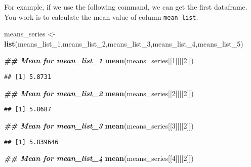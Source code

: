\documentclass[
]{article}
\newenvironment{Shaded}{\begin{snugshade}}{\end{snugshade}}
\newcommand{\DecValTok}[1]{\textcolor[rgb]{0.00,0.00,0.81}{#1}}
\newcommand{\DocumentationTok}[1]{\textcolor[rgb]{0.56,0.35,0.01}{\textbf{\textit{#1}}}}
\newcommand{\FunctionTok}[1]{\textcolor[rgb]{0.13,0.29,0.53}{\textbf{#1}}}
\newcommand{\NormalTok}[1]{#1}
\newcommand{\OtherTok}[1]{\textcolor[rgb]{0.56,0.35,0.01}{#1}}
\begin{document}
For example, if we use the following command, we can get the first
dataframe. You work is to calculate the mean value of column
\texttt{mean\_list}.

\begin{Shaded}
\begin{Highlighting}[]
\NormalTok{means\_series }\OtherTok{\textless{}{-}} \FunctionTok{list}\NormalTok{(means\_list\_1,means\_list\_2,means\_list\_3,means\_list\_4,means\_list\_5)}
\end{Highlighting}
\end{Shaded}

\begin{Shaded}
\begin{Highlighting}[]
\DocumentationTok{\#\# Mean for mean\_list\_1}
\FunctionTok{mean}\NormalTok{(means\_series[[}\DecValTok{1}\NormalTok{]][[}\DecValTok{2}\NormalTok{]])}
\end{Highlighting}
\end{Shaded}

\begin{verbatim}
## [1] 5.8731
\end{verbatim}

\begin{Shaded}
\begin{Highlighting}[]
\DocumentationTok{\#\# Mean for mean\_list\_2}
\FunctionTok{mean}\NormalTok{(means\_series[[}\DecValTok{2}\NormalTok{]][[}\DecValTok{2}\NormalTok{]])}
\end{Highlighting}
\end{Shaded}

\begin{verbatim}
## [1] 5.8687
\end{verbatim}

\begin{Shaded}
\begin{Highlighting}[]
\DocumentationTok{\#\# Mean for mean\_list\_3}
\FunctionTok{mean}\NormalTok{(means\_series[[}\DecValTok{3}\NormalTok{]][[}\DecValTok{2}\NormalTok{]])}
\end{Highlighting}
\end{Shaded}

\begin{verbatim}
## [1] 5.839646
\end{verbatim}

\begin{Shaded}
\begin{Highlighting}[]
\DocumentationTok{\#\# Mean for mean\_list\_4}
\FunctionTok{mean}\NormalTok{(means\_series[[}\DecValTok{4}\NormalTok{]][[}\DecValTok{2}\NormalTok{]])}
\end{Highlighting}
\end{Shaded}
\end{document}
